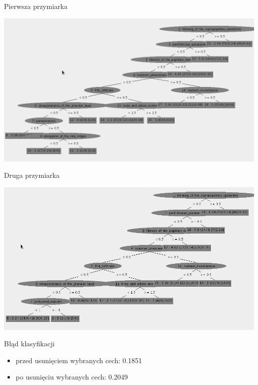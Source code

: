 \documentclass{beamer}
\begin{document}
\begin{frame}{Pierwsza przymiarka}
\begin{center}
  \includegraphics[scale=0.30]{img/decision_tree1.png}  
\end{center}
\end{frame}

\begin{frame}{Druga przymiarka}
\begin{center}
  \includegraphics[scale=0.30]{img/decision_tree2.png}  
\end{center}
\end{frame}

\begin{frame}{Błąd klasyfikacji}
\begin{itemize}
\item przed usunięciem wybranych cech: 0.1851
\item po usunięciu wybranych cech: 0.2049
\end{itemize}
\end{frame}
\end{document}
